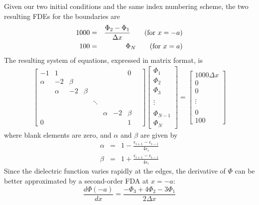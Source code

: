 \documentclass[12pt,letterpaper]{article}
\begin{document}
Given our two initial conditions and the same index numbering scheme, the two resulting FDEs for the boundaries are
\begin{eqnarray}
1000 &=& \frac{\Phi_{2} - \Phi_{1}}{\Delta x} \qquad \textnormal{(for $x = -a$)}\\
100 &=& \Phi_N \qquad \textnormal{(for $x = a$)}
\end{eqnarray}
The resulting system of equations, expressed in matrix format, is
\begin{gather}
\begin{bmatrix}
-1 & 1 &   & &  & & &  0 \quad\\
\alpha & -2 & \beta &  & & & & \\
 & \alpha & -2 & \beta  & &  & & \\
 \\
 & & & & \ddots & & & \\
 \\
& & & & & \alpha& -2& \beta \quad\\
0 & & & & & & & 1 \quad
\end{bmatrix}
\begin{bmatrix}
\Phi_1\\
\Phi_2\\
\Phi_3\\
\\
\vdots \\
\\
\Phi_{N-1}\\
\Phi_{N}
\end{bmatrix}
=
\begin{bmatrix}
1000 \Delta x\\
0\\
0\\
\\
\vdots \\
\\
0\\
100
\end{bmatrix}
\end{gather}
where blank elements are zero, and $\alpha$ and $\beta$ are given by
\begin{eqnarray*}
\alpha &=& 1 - \frac{\epsilon_{i+1} - \epsilon_{i-1}}{4\epsilon_i}\\
\beta &=& 1 + \frac{\epsilon_{i+1} - \epsilon_{i-1}}{4\epsilon_i}
\end{eqnarray*}
Since the dielectric function varies rapidly at the edges, the derivative of $\Phi$ can be better approximated by a second-order FDA at $x = -a$:
\begin{equation}
\frac{d \Phi(-a)}{dx} = \frac{-\Phi_{3} + 4\Phi_{2} - 3\Phi_1}{2\Delta x}
\end{equation}
\end{document}
